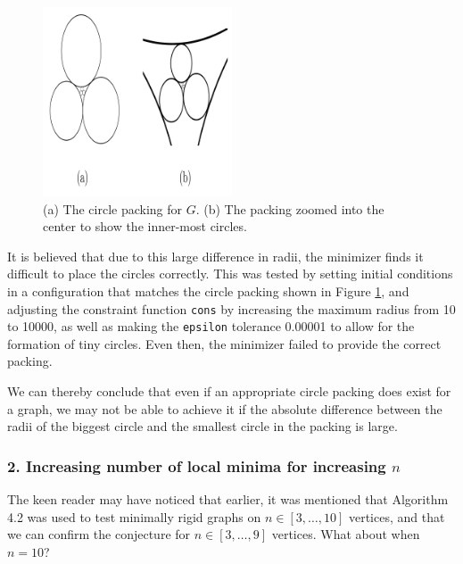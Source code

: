 \begin{figure}[htbp]
    \centering
    \includegraphics[width = 0.5\textwidth]{Chapter 4/16. interesting circle packing.png}
    \caption{(a) The circle packing for $G$. (b) The packing zoomed into the center to show the inner-most circles.}
    \label{fig4: interesting packing}
\end{figure}

\vspace{-5mm}
\begin{flushleft}
It is believed that due to this large difference in radii, the minimizer finds it difficult to place the circles correctly. This was tested by setting initial conditions in a configuration that matches the circle packing shown in Figure \ref{fig4: interesting packing}, and adjusting the constraint function \texttt{cons} by increasing the maximum radius from 10 to 10000, as well as making the \texttt{epsilon} tolerance 0.00001 to allow for the formation of tiny circles. Even then, the minimizer failed to provide the correct packing. 
\end{flushleft}

\begin{flushleft}
We can thereby conclude that even if an appropriate circle packing does exist for a graph, we may not be able to achieve it if the absolute difference between the radii of the biggest circle and the smallest circle in the packing is large.
\end{flushleft}

\subsubsection{2. Increasing number of local minima for increasing $n$}

\begin{flushleft}
The keen reader may have noticed that earlier, it was mentioned that Algorithm 4.2 was used to test minimally rigid graphs on $n \in [3, \hdots, 10]$ vertices, and that we can confirm the conjecture for $n \in [3, \hdots, 9]$ vertices. What about when $n = 10$?
\end{flushleft}

